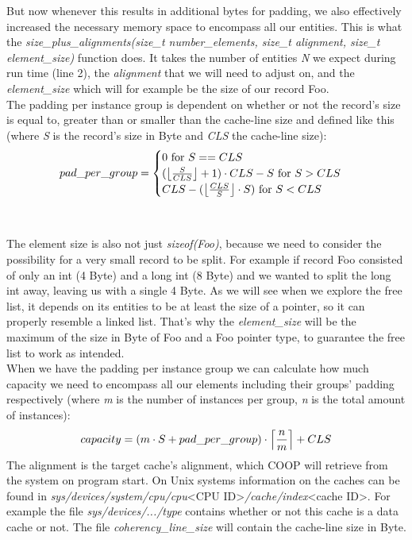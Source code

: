 But now whenever this results in additional bytes for padding, we also effectively increased the necessary memory space to encompass all our entities. This is what the \textit{size\_plus\_alignments(size\_t number\_elements, size\_t alignment, size\_t element\_size)} function does. It takes the number of entities \textit{N} we expect during run time (line 2), the \textit{alignment} that we will need to adjust on, and the \textit{element\_size} which will for example be the size of our record Foo.\\
The padding per instance group is dependent on whether or not the record's size is equal to, greater than or smaller than the cache-line size and defined like this (where \textit{S} is the record's size in Byte and \textit{CLS} the cache-line size):
\begin{align}
pad\_per\_group = \begin{cases}
	 0\text{ for } S == CLS\\
	(\left \lfloor \frac{S}{CLS} \right \rfloor +1)\cdot CLS - S \text{ for } S > CLS\\
	CLS - (\left \lfloor \frac{CLS}{S} \right \rfloor\cdot S) \text{ for } S < CLS
\end{cases}
\end{align} \\\\
The element size is also not just \textit{sizeof(Foo)}, because we need to consider the possibility for a very small record to be split. For example if record Foo consisted of only an int (4 Byte) and a long int (8 Byte) and we wanted to split the long int away, leaving us with a single 4 Byte. As we will see when we explore the free list, it depends on its entities to be at least the size of a pointer, so it can properly resemble a linked list. That's why the \textit{element\_size} will be the maximum of the size in Byte of Foo and a Foo pointer type, to guarantee the free list to work as intended.\\
When we have the padding per instance group we can calculate how much capacity we need to encompass all our elements including their groups' padding respectively (where \textit{m} is the number of instances per group, \textit{n} is the total amount of instances):
\begin{align}
	capacity = (m\cdot S + pad\_per\_group)\cdot \left \lceil \frac{n}{m} \right \rceil+CLS
\end{align}
The alignment is the target cache's alignment, which COOP will retrieve from the system on program start. On Unix systems information on the caches can be found in \textit{sys/devices/system/cpu/cpu}<CPU ID>\textit{/cache/index}<cache ID>. For example the file \textit{sys/devices/.../type} contains whether or not this cache is a data cache or not. The file \textit{coherency\_line\_size} will contain the cache-line size in Byte.\\
